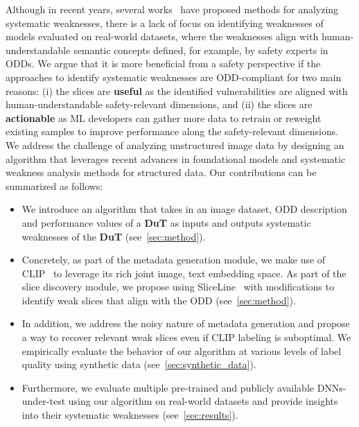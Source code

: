 Although in recent years, several works~\citep{chung2019slice, sagadeeva2021sliceline, d2022spotlight, eyuboglu2022domino, Metzen_2023_ICCV, plumb2023towards, jain2023distilling, gao2023adaptive, NEURIPS2023_0f53ecc0} have proposed methods for analyzing systematic weaknesses, there is a lack of focus on identifying weaknesses of models evaluated on real-world datasets, where the weaknesses align with human-understandable semantic concepts defined, for example, by safety experts in ODDs.
We argue that it is more beneficial from a safety perspective if the approaches to identify systematic weaknesses are ODD-compliant for two main reasons: (i) the slices are \textbf{useful} as the identified vulnerabilities are aligned with human-understandable safety-relevant dimensions, and (ii) the slices are \textbf{actionable} as ML developers can gather more data to retrain or reweight existing samples to improve performance along the safety-relevant dimensions. We address the challenge of analyzing unstructured image data by designing an algorithm that leverages recent advances in foundational models and systematic weakness analysis methods for structured data. Our contributions can be summarized as follows:
\begin{itemize}
    \item We introduce an algorithm that takes in an image dataset, ODD description and performance values of a \textbf{DuT} as inputs and outputs systematic weaknesses of the \textbf{DuT} (see~\cref{sec:method}).    
    \item Concretely, as part of the metadata generation module, we make use of CLIP~\citep{radford2021learning} to leverage its rich joint image, text embedding space. As part of the slice discovery module, we propose using SliceLine~\citep{sagadeeva2021sliceline} with modifications to identify weak slices that align with the ODD (see~\cref{sec:method}).
    \item In addition, we address the noisy nature of metadata generation and propose a way to recover relevant weak slices even if CLIP labeling is suboptimal. We empirically evaluate the behavior of our algorithm at various levels of label quality using synthetic data (see~\cref{sec:synthetic_data}). 
    \item Furthermore, we evaluate multiple pre-trained and publicly available DNNs-under-test using our algorithm on real-world datasets and provide insights into their systematic weaknesses (see~\cref{sec:results}). 
\end{itemize}






